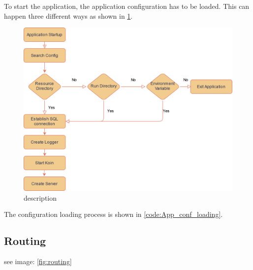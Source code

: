 To start the application, the application configuration has to be loaded. This can happen three different ways as shown in \ref{fig:startup}.

\begin{figure}[h]
\centering
\includegraphics[width=\textwidth]{images/StartupBachelor.drawio.png}
\caption{\label{fig:startup}description}
\end{figure}

The configuration loading process is shown in \ref{code:App_conf_loading}.

\subsection{Routing}

see image: \ref{fig:routing}

